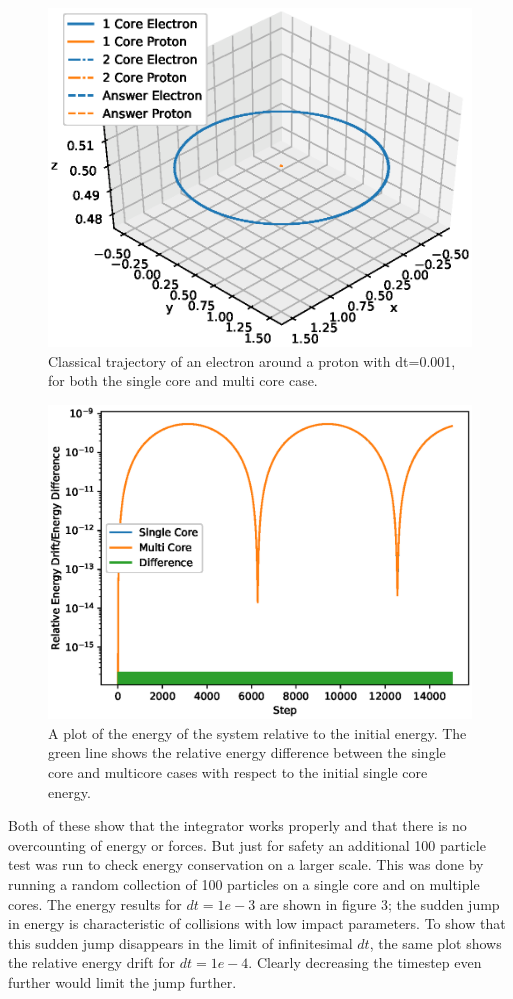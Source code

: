 \documentclass[%
 reprint,
 amsmath,amssymb,
 aps,
pra,
prb,
rmp,
prstab,
prstper,
]{revtex4-1}
\begin{document}
\begin{figure}
	\centering
	\includegraphics[width=8cm\linewidth, height=8cm\textheight]{Trajectory}
	\caption{Classical trajectory of an electron around a proton with dt=0.001, for both the single core and multi core case.}
	\label{fig:trajectory}
\end{figure}

\begin{figure}
	\centering
	\includegraphics[width=9cm\linewidth, height=5cm\textheight]{Energy}
	\caption{A plot of the energy of the system relative to the initial energy. The green line shows the relative energy difference between the single core and multicore cases with respect to the initial single core energy.}
	\label{fig:energy}
\end{figure}

Both of these show that the integrator works properly and that there is no overcounting
of energy or forces. But just for safety an additional 100 particle test was run
to check energy conservation on a larger scale. This was done by running a random 
collection of 100 particles on a single core and on multiple cores. The energy results
for $dt=1e-3$ are shown in figure 3; the sudden jump in energy is characteristic of
collisions with low impact parameters. To show that this sudden jump disappears
in the limit of infinitesimal $dt$, the same plot shows the relative energy drift
for $dt=1e-4$. Clearly decreasing the timestep even further would limit the jump 
further. 
\end{document}
